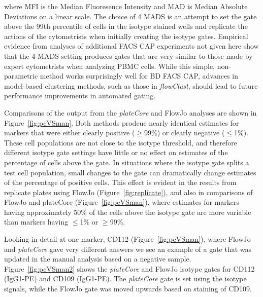 \documentclass[12pt]{article}
\newcommand{\Rpackage}[1]{{\textit{#1}}}
\begin{document}
where MFI is the Median Fluoresence Intensity and MAD is Median Absolute
Deviations on a linear scale. The choice of 4 MADS is an attempt to set the
gate above the 99th percentile of cells in the isotype stained wells and
replicate the actions of the cytometrists when initially creating the isotype
gates. Empirical evidence from analyses of additional FACS CAP experiments not
given here show that the 4 MADS setting produces gates that are very
similar to those made by expert cytometrists when analyzing PBMC cells. While
this simple, non-parametric method works surprisingly well for BD FACS CAP,
advances in model-based clustering methods, such as those in
\Rpackage{flowClust}, should lead to future performance improvements in
automated gating.

Comparisons of the output from the \Rpackage{plateCore} and FlowJo analyses are
shown in Figure~\ref{fig:pcVSman}. Both methods prodcue nearly identical
estimates for markers that were either clearly positive ($\ge$99\%) or clearly
negative ($\le$1\%). These cell populations are not close to the isotype
threshold, and therefore different isotype gate settings have little or no
effect on estimates of the percentage of cells above the gate. In situations
where the isotype gate splits a test cell population, small changes to the gate
can dramatically change estimates of the percentage of positive cells. This
effect is evident in the results from replicate plates using FlowJo
(Figure~\ref{fig:replicate}), and also in comparisons of FlowJo and plateCore
(Figure~\ref{fig:pcVSman}), where estimates for markers having approximately
50\% of the cells above the isotype gate are more variable than markers having
$\le$1\% or $\ge$99\%.

Looking in detail at one marker, CD112 (Figure~\ref{fig:pcVSman}), where FlowJo
and \Rpackage{plateCore} gave very different answers we see an example of a
gate that was updated in the manual analysis based on a negative sample.
Figure~\ref{fig:pcVSman2} shows the \Rpackage{plateCore} and FlowJo isotype
gates for CD112 (IgG1-PE) and CD109 (IgG1-PE). The \Rpackage{plateCore} gate is
set using the isotype signals, while the FlowJo gate was moved upwards based
on staining of CD109. 
\end{document}
